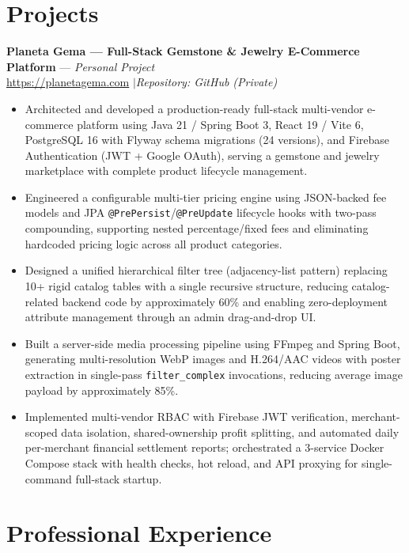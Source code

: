 \documentclass[10pt, letterpaper]{article}
\begin{document}
\section{Projects}

\textbf{Planeta Gema --- Full-Stack Gemstone \& Jewelry E-Commerce Platform} --- \textit{Personal Project} \\
\href{https://planetagema.com}{\color{linkblue}https://planetagema.com} \enspace$|$\enspace \textit{Repository: GitHub (Private)}
\vspace{2pt}
\begin{itemize}
    \item Architected and developed a production-ready full-stack multi-vendor e-commerce platform using Java 21 / Spring Boot 3, React 19 / Vite 6, PostgreSQL 16 with Flyway schema migrations (24 versions), and Firebase Authentication (JWT + Google OAuth), serving a gemstone and jewelry marketplace with complete product lifecycle management.
    \item Engineered a configurable multi-tier pricing engine using JSON-backed fee models and JPA \texttt{@PrePersist}/\texttt{@PreUpdate} lifecycle hooks with two-pass compounding, supporting nested percentage/fixed fees and eliminating hardcoded pricing logic across all product categories.
    \item Designed a unified hierarchical filter tree (adjacency-list pattern) replacing 10+ rigid catalog tables with a single recursive structure, reducing catalog-related backend code by approximately 60\% and enabling zero-deployment attribute management through an admin drag-and-drop UI.
    \item Built a server-side media processing pipeline using FFmpeg and Spring Boot, generating multi-resolution WebP images and H.264/AAC videos with poster extraction in single-pass \texttt{filter\_complex} invocations, reducing average image payload by approximately 85\%.
    \item Implemented multi-vendor RBAC with Firebase JWT verification, merchant-scoped data isolation, shared-ownership profit splitting, and automated daily per-merchant financial settlement reports; orchestrated a 3-service Docker Compose stack with health checks, hot reload, and API proxying for single-command full-stack startup.
\end{itemize}

\newpage

\section{Professional Experience}
\end{document}
